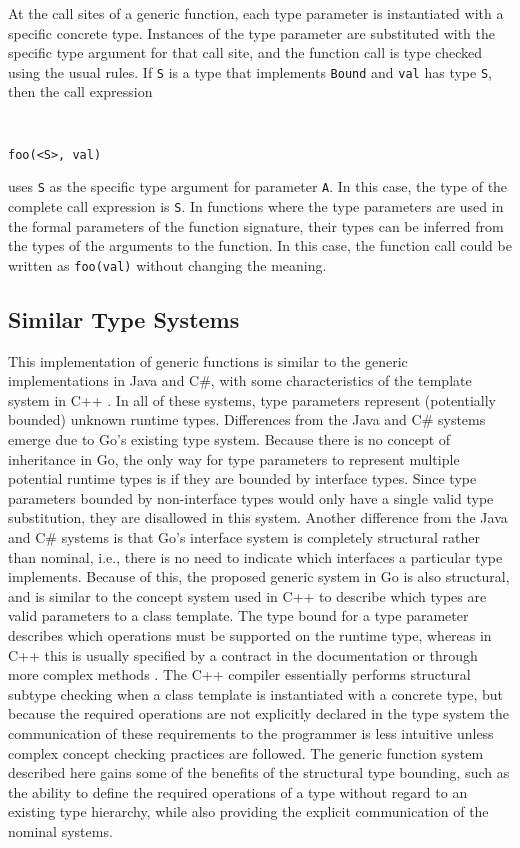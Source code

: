 \documentclass[letterpaper,twocolumn,11pt]{article}
\begin{document}
At the call sites of a generic function, each type parameter is instantiated with a specific concrete type. Instances of the type parameter are substituted with the specific type argument for that call site, and the function call is type checked using the usual rules. If \texttt{S} is a type that implements \texttt{Bound} and \texttt{val} has type \texttt{S}, then the call expression
{ \tt \small
\begin{verbatim}
foo(<S>, val)
\end{verbatim}
}
uses \texttt{S} as the specific type argument for parameter \texttt{A}. In this case, the type of the complete call expression is \texttt{S}. In functions where the type parameters are used in the formal parameters of the function signature, their types can be inferred from the types of the arguments to the function. In this case, the function call could be written as \texttt{foo(val)} without changing the meaning.

\subsection{Similar Type Systems} \label{similar_type_systems}

This implementation of generic functions is similar to the generic implementations in Java and C\#, with some characteristics of the template system in C++ \cite{ghosh2004generics} \cite{csharp}. In all of these systems, type parameters represent (potentially bounded) unknown runtime types. Differences from the Java and C\# systems emerge due to Go's existing type system. Because there is no concept of inheritance in Go, the only way for type parameters to represent multiple potential runtime types is if they are bounded by interface types. Since type parameters bounded by non-interface types would only have a single valid type substitution, they are disallowed in this system. Another difference from the Java and C\# systems is that Go's interface system is completely structural rather than nominal, i.e., there is no need to indicate which interfaces a particular type implements. Because of this, the proposed generic system in Go is also structural, and is similar to the concept system used in C++ to describe which types are valid parameters to a class template. The type bound for a type parameter describes which operations must be supported on the runtime type, whereas in C++ this is usually specified by a contract in the documentation or through more complex methods \cite{siek2000concept}. The C++ compiler essentially performs structural subtype checking when a class template is instantiated with a concrete type, but because the required operations are not explicitly declared in the type system the communication of these requirements to the programmer is less intuitive unless complex concept checking practices are followed. The generic function system described here gains some of the benefits of the structural type bounding, such as the ability to define the required operations of a type without regard to an existing type hierarchy, while also providing the explicit communication of the nominal systems.
\end{document}
